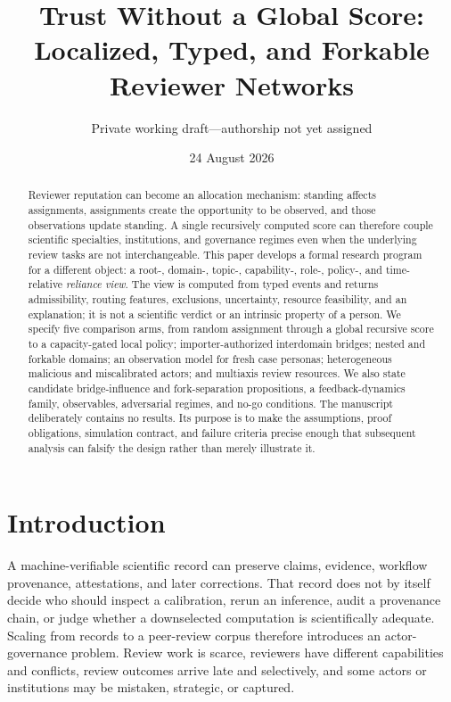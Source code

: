 \documentclass[11pt]{article}
\title{Trust Without a Global Score:\\Localized, Typed, and Forkable Reviewer Networks}
\author{Private working draft---authorship not yet assigned}
\date{24 August 2026}
\begin{document}
\maketitle


\begin{abstract}
Reviewer reputation can become an allocation mechanism: standing affects assignments, assignments create the opportunity to be observed, and those observations update standing.  A single recursively computed score can therefore couple scientific specialties, institutions, and governance regimes even when the underlying review tasks are not interchangeable.  This paper develops a formal research program for a different object: a root-, domain-, topic-, capability-, role-, policy-, and time-relative \emph{reliance view}.  The view is computed from typed events and returns admissibility, routing features, exclusions, uncertainty, resource feasibility, and an explanation; it is not a scientific verdict or an intrinsic property of a person.  We specify five comparison arms, from random assignment through a global recursive score to a capacity-gated local policy; importer-authorized interdomain bridges; nested and forkable domains; an observation model for fresh case personas; heterogeneous malicious and miscalibrated actors; and multiaxis review resources.  We also state candidate bridge-influence and fork-separation propositions, a feedback-dynamics family, observables, adversarial regimes, and no-go conditions.  The manuscript deliberately contains no results.  Its purpose is to make the assumptions, proof obligations, simulation contract, and failure criteria precise enough that subsequent analysis can falsify the design rather than merely illustrate it.
\end{abstract}

\section{Introduction}

A machine-verifiable scientific record can preserve claims, evidence, workflow provenance, attestations, and later corrections.  That record does not by itself decide who should inspect a calibration, rerun an inference, audit a provenance chain, or judge whether a downselected computation is scientifically adequate.  Scaling from records to a peer-review corpus therefore introduces an actor-governance problem.  Review work is scarce, reviewers have different capabilities and conflicts, review outcomes arrive late and selectively, and some actors or institutions may be mistaken, strategic, or captured.
\end{document}
